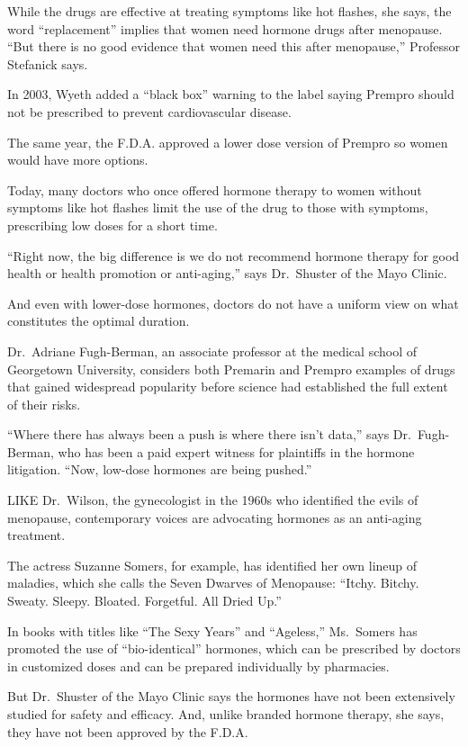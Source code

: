 ﻿\documentclass[12pt]{article}
\begin{document}
While the drugs are effective at treating symptoms like hot flashes, she says, the word
``replacement'' implies that women need hormone drugs after menopause. ``But there is no good
evidence that women need this after menopause,'' Professor Stefanick says.

In 2003, Wyeth added a ``black box'' warning to the label saying Prempro should not be prescribed to
prevent cardiovascular disease.

The same year, the F.D.A. approved a lower dose version of Prempro so women would have more options.

Today, many doctors who once offered hormone therapy to women without symptoms like hot flashes
limit the use of the drug to those with symptoms, prescribing low doses for a short time.

``Right now, the big difference is we do not recommend hormone therapy for good health or health
promotion or anti-aging,'' says Dr.~Shuster of the Mayo Clinic.

And even with lower-dose hormones, doctors do not have a uniform view on what constitutes the
optimal duration.

Dr.~Adriane Fugh-Berman, an associate professor at the medical school of Georgetown University,
considers both Premarin and Prempro examples of drugs that gained widespread popularity before
science had established the full extent of their risks.

``Where there has always been a push is where there isn't data,'' says Dr.~Fugh-Berman, who has been
a paid expert witness for plaintiffs in the hormone litigation. ``Now, low-dose hormones are being
pushed.''

LIKE Dr.~Wilson, the gynecologist in the 1960s who identified the evils of menopause, contemporary
voices are advocating hormones as an anti-aging treatment.

The actress Suzanne Somers, for example, has identified her own lineup of maladies, which she calls
the Seven Dwarves of Menopause: ``Itchy. Bitchy. Sweaty. Sleepy. Bloated. Forgetful. All Dried Up.''

In books with titles like ``The Sexy Years'' and ``Ageless,'' Ms.~Somers has promoted the use of
``bio-identical'' hormones, which can be prescribed by doctors in customized doses and can be
prepared individually by pharmacies.

But Dr.~Shuster of the Mayo Clinic says the hormones have not been extensively studied for safety
and efficacy. And, unlike branded hormone therapy, she says, they have not been approved by the
F.D.A.
\end{document}
